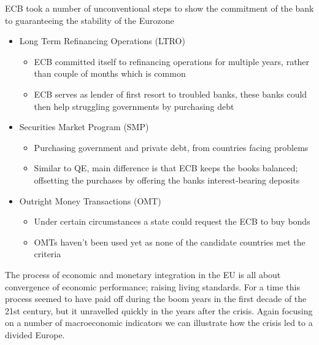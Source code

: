 \documentclass{beamer}
\begin{document}
\begin{frame}
  ECB took a number of unconventional steps to show the commitment of the bank to guaranteeing the stability of the Eurozone
\begin{itemize}
  \item Long Term Refinancing Operations (LTRO)
  \begin{itemize}
    \item ECB committed itself to refinancing operations for multiple years, rather than couple of months which is common    
     \item ECB serves as lender of first resort to troubled banks, these banks could then help struggling governments by purchasing debt    
  \end{itemize}
  \item Securities Market Program (SMP)
  \begin{itemize}
    \item Purchasing government and private debt, from countries facing problems
    \item Similar to QE, main difference is that ECB keeps the books balanced; offsetting the purchases by offering the banks interest-bearing deposits
  \end{itemize}
  \item Outright Money Transactions (OMT)
  \begin{itemize}
    \item Under certain circumstances a state could request the ECB to buy bonds     
    \item OMTs haven't been used yet as none of the candidate countries met the criteria
  \end{itemize}
\end{itemize}
\end{frame}

\begin{frame}
  The process of economic and monetary integration in the EU is all about convergence of economic performance; raising living standards. 
For a time this process seemed to have paid off during the boom years in the first decade of the 21st century, but it unravelled quickly in the years after the crisis. 
Again focusing on a number of macroeconomic indicators we can illustrate how the crisis led to a divided Europe. 
\end{frame}
\end{document}
